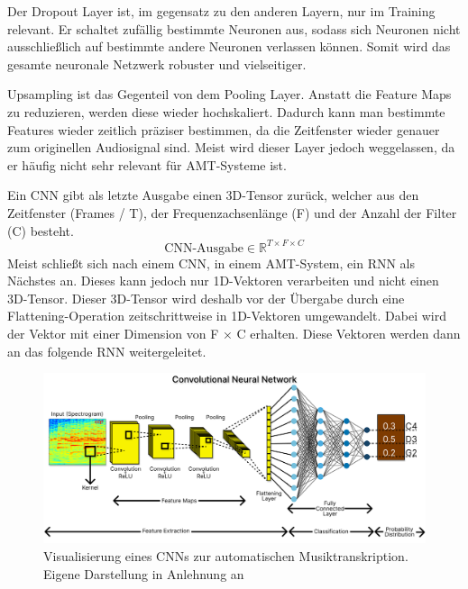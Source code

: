 Der Dropout Layer ist, im gegensatz zu den anderen Layern, nur im Training relevant.
Er schaltet zufällig bestimmte Neuronen aus,
sodass sich Neuronen nicht ausschließlich auf bestimmte andere Neuronen verlassen können.
Somit wird das gesamte neuronale Netzwerk robuster und vielseitiger.

Upsampling ist das Gegenteil von dem Pooling Layer.
Anstatt die Feature Maps zu reduzieren, werden diese wieder hochskaliert.
Dadurch kann man bestimmte Features wieder zeitlich präziser bestimmen,
da die Zeitfenster wieder genauer zum originellen Audiosignal sind.
Meist wird dieser Layer jedoch weggelassen, da er häufig nicht sehr relevant für AMT-Systeme ist.

Ein CNN gibt als letzte Ausgabe einen 3D-Tensor zurück,
welcher aus den Zeitfenster (Frames / T), der Frequenzachsenlänge (F) und der Anzahl der Filter (C) besteht.
\[
\text{CNN-Ausgabe} \in \mathbb{R}^{T \times F \times C}
\]
Meist schließt sich nach einem CNN, in einem AMT-System, ein RNN als Nächstes an.
Dieses kann jedoch nur 1D-Vektoren verarbeiten und nicht einen 3D-Tensor.
Dieser 3D-Tensor wird deshalb vor der Übergabe durch eine Flattening-Operation
zeitschrittweise in 1D-Vektoren umgewandelt.
Dabei wird der Vektor mit einer Dimension von F × C erhalten.
Diese Vektoren werden dann an das folgende RNN weitergeleitet.

\begin{figure}[H]
    \centering
    \includegraphics[width=1\textwidth]{Graphics/CNN}
    \caption{Visualisierung eines CNNs zur automatischen Musiktranskription. Eigene Darstellung in Anlehnung an \cite{shahriar2020cnn}}
    \label{fig:cnn-amt}
\end{figure}

